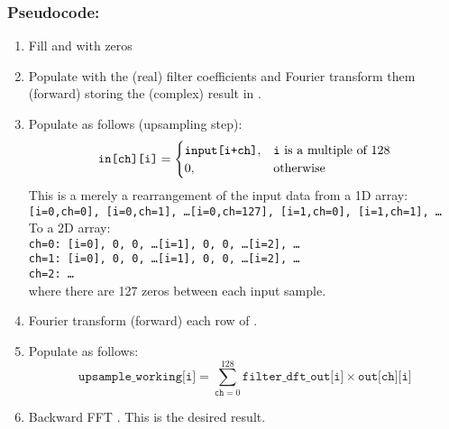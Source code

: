 \documentclass{article}
\begin{document}
\subsubsection*{Pseudocode:}
\begin{enumerate}
    \item Fill  and  with zeros
    \item Populate  with the (real) filter coefficients and Fourier transform them (forward) storing the (complex) result in .
    \item Populate  as follows (upsampling step):
        \begin{equation}
            \texttt{in[ch][i]} =
            \begin{cases}
                \texttt{input[i+ch]}, & \text{\texttt{i} is a multiple of 128} \\
                0, & \text{otherwise}
            \end{cases}
        \end{equation}
        This is a merely a rearrangement of the input data from a 1D array:\\[8pt]
        \texttt{[i=0,ch=0], [i=0,ch=1], \dots [i=0,ch=127], [i=1,ch=0], [i=1,ch=1], \dots}\\[8pt]
        To a 2D array:\\[8pt]
        \texttt{ch=0: [i=0], 0, 0, \dots [i=1], 0, 0, \dots [i=2], \dots}\\
        \texttt{ch=1: [i=0], 0, 0, \dots [i=1], 0, 0, \dots [i=2], \dots}\\
        \texttt{ch=2: \dots}\\[8pt]
        where there are 127 zeros between each input sample.
    \item Fourier transform (forward) each row of .
    \item Populate  as follows:
        \begin{equation}
            \texttt{upsample\_working[i]}
              = \sum_{\texttt{ch}=0}^{128} \texttt{filter\_dft\_out[i]} \times \texttt{out[ch][i]}
        \end{equation}
    \item Backward FFT . This is the desired result.
\end{enumerate}
\end{document}
